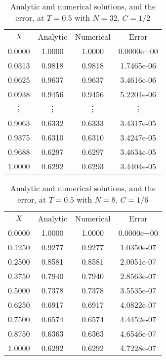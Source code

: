 \documentclass[12pt]{extarticle}
\begin{document}
\begin{table}[htp!]
\caption{Analytic and numerical solutions, and the error, at $T=0.5$ with $N=32$, $C=1/2$ }
\centering
\begin{tabular}{cccc}
\\
$X$ & Analytic & Numerical & Error \\ [0.5ex]
0.0000 & 1.0000 & 1.0000 & 0.0000e+00 \\ 
0.0313 & 0.9818 & 0.9818 & 1.7465e-06 \\ 
0.0625 & 0.9637 & 0.9637 & 3.4616e-06 \\ 
0.0938 & 0.9456 & 0.9456 & 5.2201e-06 \\ 
\vdots & \vdots & \vdots & \vdots     \\
0.9063 & 0.6332 & 0.6333 & 3.4317e-05 \\ 
0.9375 & 0.6310 & 0.6310 & 3.4247e-05 \\ 
0.9688 & 0.6297 & 0.6297 & 3.4634e-05 \\ 
1.0000 & 0.6292 & 0.6293 & 3.4404e-05 \\ 
\end{tabular}
\label{table:7}
\end{table}

\begin{table}[htp!]
\caption{Analytic and numerical solutions, and the error, at $T=0.5$ with $N=8$, $C=1/6$ }
\centering
\begin{tabular}{cccc}
\\
$X$ & Analytic & Numerical & Error \\ [0.5ex]
0.0000 & 1.0000 & 1.0000 & 0.0000e+00 \\ 
0.1250 & 0.9277 & 0.9277 & 1.0350e-07 \\ 
0.2500 & 0.8581 & 0.8581 & 2.0051e-07 \\ 
0.3750 & 0.7940 & 0.7940 & 2.8563e-07 \\ 
0.5000 & 0.7378 & 0.7378 & 3.5535e-07 \\ 
0.6250 & 0.6917 & 0.6917 & 4.0822e-07 \\ 
0.7500 & 0.6574 & 0.6574 & 4.4452e-07 \\ 
0.8750 & 0.6363 & 0.6363 & 4.6546e-07 \\ 
1.0000 & 0.6292 & 0.6292 & 4.7228e-07 \\ 
\end{tabular}
\label{table:8}
\end{table}
\end{document}
